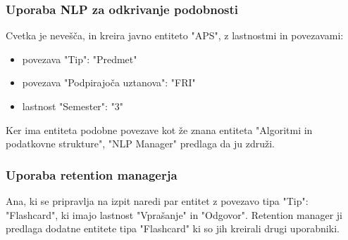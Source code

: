 \documentclass{article}
\begin{document}
\subsubsection{Uporaba NLP za odkrivanje podobnosti}
Cvetka je nevešča, in kreira javno entiteto "APS", z lastnostmi in povezavami:
\begin{itemize}
    \item povezava "Tip": "Predmet"
    \item povezava "Podpirajoča uztanova": "FRI"
    \item lastnost "Semester": "3"
\end{itemize}
Ker ima entiteta podobne povezave kot že znana entiteta "Algoritmi in podatkovne strukture", "NLP Manager" predlaga da ju združi.

\subsubsection{Uporaba retention managerja}
Ana, ki se pripravlja na izpit naredi par entitet z povezavo tipa "Tip": "Flashcard", ki imajo lastnost "Vprašanje" in "Odgovor". Retention manager ji predlaga dodatne entitete tipa "Flashcard" ki so jih kreirali drugi uporabniki.
\end{document}
